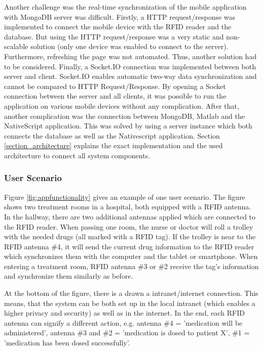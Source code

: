 Another challenge was the real-time synchronization of the mobile application with MongoDB server was difficult. Firstly, a HTTP request/response was implemented to connect the mobile device with the RFID reader and the database. But using the HTTP request/response was a very static and non-scalable solution (only one device was enabled to connect to the server). Furthermore, refreshing the page was not automated. Thus, another solution had to be considered. Finally, a Socket.IO connection was implemented between both server and client. Socket.IO enables automatic two-way data synchronization and cannot be compared to HTTP Request/Response. By opening a Socket connection between the server and all clients, it was possible to run the application on various mobile devices without any complication. 
After that, another complication was the connection between MongoDB, Matlab and the NativeScript application. This was solved by using a server instance which both connects the database as well as the Nativescript application. Section \ref{section_architecture} explains the exact implementation and the used architecture to connect all system components. 

\subsubsection{User Scenario}

Figure \ref{fig:appfunctionality} gives an example of one user scenario. The figure shows two treatment rooms in a hospital, both equipped with a RFID antenna. In the hallway, there are two additional antennas applied which are connected to the RFID reader. When passing one room, the nurse or doctor will roll a trolley with the needed drugs (all marked with a RFID tag). If the trolley is near to the RFID antenna \#4, it will send the current drug information to the RFID reader which synchronizes them with the computer and the tablet or smartphone. When entering a treatment room, RFID antenna \#3 or \#2 receive the tag's information and synchronize them similarly as before.

At the bottom of the figure, there is a drawn a intranet/internet connection. This means, that the system can be both set up in the local intranet (which enables a higher privacy and security) as well as in the internet. In the end, each RFID antenna can signify a different action, e.g. antenna \#4 = 'medication will be administered', antenna \#3 and \#2 = 'medication is dosed to patient X', \#1 = 'medication has been dosed successfully'.


